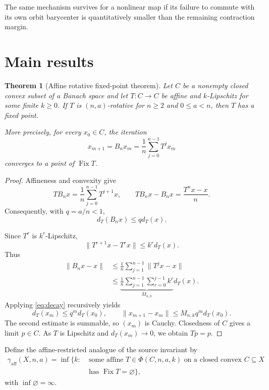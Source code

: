 \documentclass[11pt]{article}
\newtheorem{theorem}{Theorem}
\newcommand{\Fix}{\operatorname{Fix}}
\begin{document}
The same mechanism survives for a nonlinear map if its failure to commute with its own
orbit barycenter is quantitatively smaller than the remaining contraction margin.

\section{Main results}

\begin{theorem}[Affine rotative fixed-point theorem]\label{thm:affine}
Let $C$ be a nonempty closed convex subset of a Banach space and let $T:C\to C$
be affine and $k$-Lipschitz for some finite $k\geq0$. If $T$ is $(n,a)$-rotative
for $n\geq2$ and $0\leq a<n$, then $T$ has a fixed point.

More precisely, for every $x_0\in C$, the iteration
\[
 x_{m+1}=B_nx_m=\frac1n\sum_{j=0}^{n-1}T^jx_m
\]
converges to a point of $\Fix T$.
\end{theorem}

\begin{proof}
Affineness and convexity give
\[
 TB_nx=\frac1n\sum_{j=0}^{n-1}T^{j+1}x,
 \qquad
 TB_nx-B_nx=\frac{T^nx-x}{n}.
\]
Consequently, with $q=a/n<1$,
\begin{equation}\label{eq:decay}
 d_T(B_nx)\leq qd_T(x).
\end{equation}

Since $T^r$ is $k^r$-Lipschitz,
\[
 \|T^{r+1}x-T^rx\|\leq k^r d_T(x).
\]
Thus
\begin{align*}
 \|B_nx-x\|
 &\leq\frac1n\sum_{j=1}^{n-1}\|T^jx-x\|\\
 &\leq \underbrace{\frac1n\sum_{j=1}^{n-1}
       \sum_{r=0}^{j-1}k^r}_{M_{n,k}}d_T(x).
\end{align*}
Applying \eqref{eq:decay} recursively yields
\[
 d_T(x_m)\leq q^m d_T(x_0),
 \qquad
 \|x_{m+1}-x_m\|\leq M_{n,k}q^m d_T(x_0).
\]
The second estimate is summable, so $(x_m)$ is Cauchy. Closedness of $C$ gives a
limit $p\in C$. As $T$ is Lipschitz and $d_T(x_m)\to0$, we obtain $Tp=p$.
\end{proof}

Define the affine-restricted analogue of the source invariant by
\[
 \begin{aligned}
 \gamma_{\mathrm{aff}}(X,n,a)=\inf\{k:\;&\text{some affine }T\in
 \Phi(C,n,a,k)\text{ on a closed convex }C\subseteq X\\
 &\text{has }\Fix T=\varnothing\},
 \end{aligned}
\]
with $\inf\varnothing=\infty$.
\end{document}
